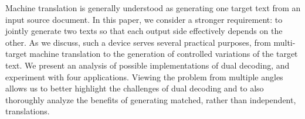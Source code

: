 Machine translation is generally understood as generating one target text from an input source document. In this paper, we consider a stronger requirement: to jointly generate two texts so that each output side effectively depends on the other. As we discuss, such a device serves several practical purposes, from multi-target machine translation to the generation of controlled variations of the target text. We present an analysis of possible implementations of dual decoding, and experiment with four applications. Viewing the problem from multiple angles allows us to better highlight the challenges of dual decoding and to also thoroughly analyze the benefits of generating matched, rather than independent, translations.
